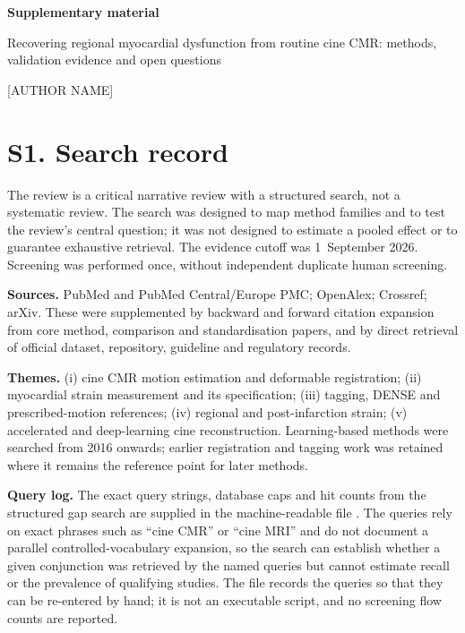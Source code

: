 \documentclass[10pt,a4paper]{article}
\begin{document}
\begin{center}
{\Large\bfseries Supplementary material}\par
\vspace{0.4em}
{\large Recovering regional myocardial dysfunction from routine cine CMR: methods, validation
evidence and open questions}\par
\vspace{0.3em}
{[AUTHOR NAME]}\par
\end{center}

\section*{S1. Search record}

The review is a critical narrative review with a structured search, not a systematic review. The
search was designed to map method families and to test the review's central question; it was not
designed to estimate a pooled effect or to guarantee exhaustive retrieval. The evidence cutoff was
1~September 2026. Screening was performed once, without independent duplicate human screening.

\textbf{Sources.} PubMed and PubMed Central/Europe PMC; OpenAlex; Crossref; arXiv. These were
supplemented by backward and forward citation expansion from core method, comparison and
standardisation papers, and by direct retrieval of official dataset, repository, guideline and
regulatory records.

\textbf{Themes.} (i) cine CMR motion estimation and deformable registration; (ii) myocardial strain
measurement and its specification; (iii) tagging, DENSE and prescribed-motion references;
(iv) regional and post-infarction strain; (v) accelerated and deep-learning cine reconstruction.
Learning-based methods were searched from 2016 onwards; earlier registration and tagging work was
retained where it remains the reference point for later methods.

\textbf{Query log.} The exact query strings, database caps and hit counts from the structured gap
search are supplied in the machine-readable file . The
queries rely on exact phrases such as \enquote{cine CMR} or \enquote{cine MRI} and do not document a
parallel controlled-vocabulary expansion, so the search can establish whether a given conjunction
was retrieved by the named queries but cannot estimate recall or the prevalence of qualifying
studies. The file records the queries so that they can be re-entered by hand; it is not an
executable script, and no screening flow counts are reported.
\end{document}
